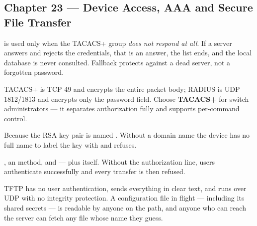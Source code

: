 \subsection*{Chapter 23 --- Device Access, AAA and Secure File Transfer}
\begin{tightnum}
  \item {} is used only when the TACACS+ group \emph{does not respond at
        all}. If a server answers and rejects the credentials, that is an answer,
        the list ends, and the local database is never consulted. Fallback
        protects against a dead server, not a forgotten password.
  \item TACACS+ is TCP 49 and encrypts the entire packet body; RADIUS is UDP
        1812/1813 and encrypts only the password field. Choose \textbf{TACACS+}
        for switch administrators --- it separates authorization fully and
        supports per-command control.
  \item Because the RSA key pair is named . Without a domain
        name the device has no full name to label the key with and refuses.
  \item {}, an  method, and
         --- plus  itself.
        Without the authorization line, users authenticate successfully and every
        transfer is then refused.
  \item TFTP has no user authentication, sends everything in clear text, and runs
        over UDP with no integrity protection. A configuration file in flight ---
        including its shared secrets --- is readable by anyone on the path, and
        anyone who can reach the server can fetch any file whose name they guess.
\end{tightnum}

